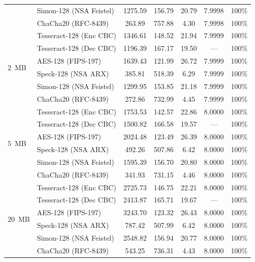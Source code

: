 \documentclass[review,12pt]{elsarticle}
\begin{document}
\begin{table}[htbp]
{\begin{tabular}{@{}llccccc@{}}
 & Simon-128 (NSA Feistel)      & 1275.59 & 156.79 & 20.79 & 7.9998 & 100\% \\
 & ChaCha20 (RFC-8439)          & 263.89  & 757.88 & 4.30  & 7.9998 & 100\% \\ \midrule
\multirow{6}{*}{$2$~MB} 
 & Tesseract-128 (Enc CBC)        & 1346.61 & 148.52 & 21.94 & 7.9999 & 100\% \\
 & Tesseract-128 (Dec CBC)        & 1196.39 & 167.17 & 19.50 & --- & 100\% \\
 & AES-128 (FIPS-197)          & 1639.43 & 121.99 & 26.72 & 7.9999 & 100\% \\
 & Speck-128 (NSA ARX)          & 385.81  & 518.39 & 6.29  & 7.9999 & 100\% \\
 & Simon-128 (NSA Feistel)      & 1299.95 & 153.85 & 21.18 & 7.9999 & 100\% \\
 & ChaCha20 (RFC-8439)          & 272.86  & 732.99 & 4.45  & 7.9999 & 100\% \\ \midrule
\multirow{6}{*}{$5$~MB} 
 & Tesseract-128 (Enc CBC)        & 1753.53 & 142.57 & 22.86 & 8.0000 & 100\% \\
 & Tesseract-128 (Dec CBC)        & 1500.82 & 166.58 & 19.57 & --- & 100\% \\
 & AES-128 (FIPS-197)          & 2024.48 & 123.49 & 26.39 & 8.0000 & 100\% \\
 & Speck-128 (NSA ARX)          & 492.26  & 507.86 & 6.42  & 8.0000 & 100\% \\
 & Simon-128 (NSA Feistel)      & 1595.39 & 156.70 & 20.80 & 8.0000 & 100\% \\
 & ChaCha20 (RFC-8439)          & 341.93  & 731.15 & 4.46  & 8.0000 & 100\% \\ \midrule
\multirow{6}{*}{$20$~MB} 
 & Tesseract-128 (Enc CBC)        & 2725.73 & 146.75 & 22.21 & 8.0000 & 100\% \\
 & Tesseract-128 (Dec CBC)        & 2413.87 & 165.71 & 19.67 & --- & 100\% \\
 & AES-128 (FIPS-197)          & 3243.70 & 123.32 & 26.43 & 8.0000 & 100\% \\
 & Speck-128 (NSA ARX)          & 787.42  & 507.99 & 6.42  & 8.0000 & 100\% \\
 & Simon-128 (NSA Feistel)      & 2548.82 & 156.94 & 20.77 & 8.0000 & 100\% \\
  & ChaCha20 (RFC-8439)          & 543.25  & 736.31 & 4.43  & 8.0000 & 100\% \\ \bottomrule
\end{tabular}%
}
\end{table}
\end{document}
